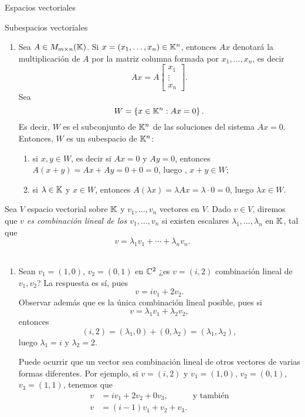 \begin{chapter}{Espacios vectoriales}
\begin{section}{Subespacios vectoriales}
\begin{ejemplo*}
\begin{enumerate}
        \item Sea $A \in M_{m \times n}(\mathbb K)$. Si $x = (x_1,\ldots,x_n) \in \mathbb K^n$,  entonces $Ax$ denotará la multiplicación de $A$ por la matriz columna formada por $x_1,\ldots,x_n$,  es decir
        $$
        Ax = A\begin{bmatrix} x_1 \\ \vdots \\ x_n\end{bmatrix}.
        $$
        Sea 
        $$
        W = \left\{x \in \mathbb K^n: Ax=0 \right\}.
        $$
        Es decir, $W$  es el subconjunto de $\mathbb K^n$ de las soluciones del sistema $Ax=0$. Entonces, $W$  es un subespacio de $\mathbb K^n$:
        \begin{enumerate}
            \item si $x,y \in W$, es decir si $Ax=0$ y $Ay=0$,  entonces $A(x+y) = Ax + Ay = 0 + 0 = 0$, luego , $x+y \in W$;
            \item si $\lambda \in \mathbb K$ y $x \in W$, entonces $A(\lambda x) = \lambda Ax =\lambda\cdot 0 =0$, luego $\lambda x \in W$. 
        \end{enumerate}
    \end{enumerate}
\end{ejemplo*}

\begin{definicion}
    Sea $V$ espacio vectorial sobre $\mathbb K$ y $v_1,\ldots,v_n$ vectores en $V$. Dado $v \in V$, diremos que\textit{ $v$  es combinación lineal de los $v_1,\ldots,v_n$ } si existen escalares $\lambda_1,\ldots,\lambda_n$ en $\mathbb K$,  tal que 
    $$
    v = \lambda_1v_1+\cdots+\lambda_nv_n.
    $$
\end{definicion}

\begin{ejemplo*} ${}^{}$
\begin{enumerate}
    \item Sean $v_1 = (1,0)$, $v_2 = (0,1)$ en $\mathbb C^2$ ¿es $v = (i,2)$ combinación lineal de $v_1,v_2$? La respuesta es sí, pues 
    $$
    v = iv_1+2v_2.
    $$
    Observar además que es la única combinación lineal posible, pues si 
    $$
    v = \lambda_1v_1+ \lambda_2 v_2,
    $$
    entonces
    $$
    (i,2) = (\lambda_1,0)+(0,\lambda_2) = (\lambda_1,\lambda_2),
    $$
    luego $\lambda_1=i$ y $\lambda_2= 2$.
    
    Puede ocurrir que un vector sea combinación lineal de otros vectores de varias formas diferentes. Por ejemplo,   si   $v = (i,2)$ y $v_1 = (1,0)$, $v_2 = (0,1)$, $v_3 = (1,1)$,  tenemos que
    \begin{align*}
        v &= iv_1+2v_2+0v_3,\quad\quad\quad\text{y también}\\
        v &= (i-1)v_1 + v_2 + v_3.  
    \end{align*}
    

\end{enumerate}
\end{ejemplo*}
\end{section}
\end{chapter}

